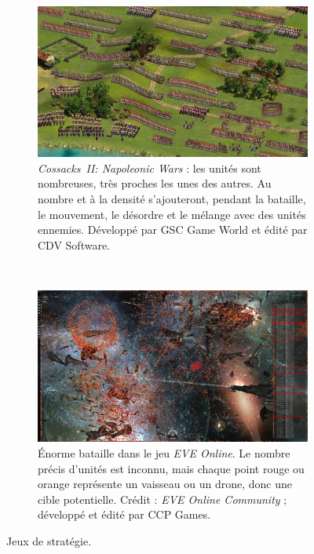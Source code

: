 	\begin{figure}[!htbp]
		\begin{subfigure}[t]{\textwidth}
			\centering
			\includegraphics[width=\textwidth]{figures/ch1/cossacks2}
			\caption[Un RTS avec de très nombreuses unités : \emph{Cossacks~II: Napoleonic Wars}]{\emph{Cossacks~II: Napoleonic Wars} : les unités sont nombreuses, très proches les unes des autres. Au nombre et à la densité s'ajouteront, pendant la bataille, le mouvement, le désordre et le mélange avec des unités ennemies. Développé par GSC Game World et édité par CDV Software.}
			\label{fig:cossacks2}
		\end{subfigure}
		~
		\begin{subfigure}[t]{\textwidth}
			\centering
			\includegraphics[width=\textwidth]{figures/ch1/eveonline}
			\caption[Énorme bataille dans le jeu \emph{EVE Online}]{Énorme bataille dans le jeu \emph{EVE Online}. Le nombre précis d'unités est inconnu, mais chaque point rouge ou orange représente un vaisseau ou un drone, donc une cible potentielle. Crédit : \emph{EVE Online Community} ; développé et édité par CCP Games.}
			\label{fig:eveonline}
		\end{subfigure}
		\caption[Jeux de stratégie]{Jeux de stratégie.}
		\label{fig:stratGames}
	\end{figure}

